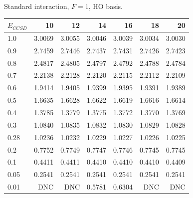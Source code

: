 \begin{table}
\begin{center}
Standard interaction, $F=1$, HO basis.\\
\begin{tabular}{l|rrrrrr}
\hline 
$E_{CCSD}$ & 10 & 12 & 14 & 16 & 18 & 20 \\
\hline \hline
1.0 & 3.0069 & 3.0055 & 3.0046 & 3.0039 & 3.0034 & 3.0030  \\ 
0.9 & 2.7459 & 2.7446 & 2.7437 & 2.7431 & 2.7426 & 2.7423  \\ 
0.8 & 2.4817 & 2.4805 & 2.4797 & 2.4792 & 2.4788 & 2.4784  \\ 
0.7 & 2.2138 & 2.2128 & 2.2120 & 2.2115 & 2.2112 & 2.2109  \\ 
0.6 & 1.9414 & 1.9405 & 1.9399 & 1.9395 & 1.9391 & 1.9389  \\ 
0.5 & 1.6635 & 1.6628 & 1.6622 & 1.6619 & 1.6616 & 1.6614  \\ 
0.4 & 1.3785 & 1.3779 & 1.3775 & 1.3772 & 1.3770 & 1.3769  \\ 
0.3 & 1.0840 & 1.0835 & 1.0832 & 1.0830 & 1.0829 & 1.0828  \\ 
0.28 & 1.0236 & 1.0232 & 1.0229 & 1.0227 & 1.0226 & 1.0225  \\ 
0.2 & 0.7752 & 0.7749 & 0.7747 & 0.7746 & 0.7745 & 0.7745  \\ 
0.1 & 0.4411 & 0.4411 & 0.4410 & 0.4410 & 0.4410 & 0.4409  \\ 
0.05 & 0.2541 & 0.2541 & 0.2541 & 0.2541 & 0.2541 & 0.2541  \\ 
0.01 & DNC & DNC & 0.5781 & 0.6304 & DNC & DNC  \\ 
\hline \hline
\end{tabular}
\end{center}
\end{table}

